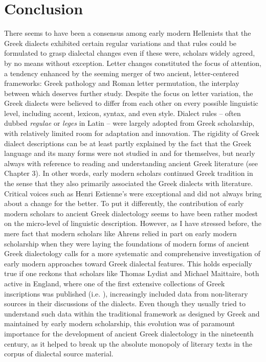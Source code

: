 \section{Conclusion}\label{sec:6.5}

There seems to have been a consensus among early modern Hellenists that the Greek dialects exhibited certain regular variations and that rules could be formulated to grasp dialectal changes even if these were, scholars widely agreed, by no means without exception. Letter changes constituted the focus of attention, a tendency enhanced by the seeming merger of two ancient, letter-centered frameworks: Greek pathology and Roman letter permutation, the interplay between which deserves further study. Despite the focus on letter variation, the Greek dialects were believed to differ from each other on every possible linguistic level, including accent, lexicon, syntax, and even style. Dialect rules – often dubbed \textit{regulae} or \textit{leges} in Latin – were largely adopted from Greek scholarship, with relatively limited room for adaptation and innovation. The rigidity of Greek dialect descriptions can be at least partly explained by the fact that the Greek language and its many forms were not studied in and for themselves, but nearly always with reference to reading and understanding ancient Greek literature (see Chapter 3). In other words, early modern scholars continued Greek tradition in the sense that they also primarily associated the Greek dialects with literature. Critical voices such as Henri Estienne’s were exceptional and did not always bring about a change for the better. To put it differently, the contribution of early modern scholars to ancient Greek dialectology seems to have been rather modest on the micro-level of linguistic description. However, as I have stressed before, the mere fact that modern scholars like Ahrens relied in part on early modern scholarship when they were laying the foundations of modern forms of ancient Greek dialectology calls for a more systematic and comprehensive investigation of early modern approaches toward Greek dialectal features. This holds especially true if one reckons that scholars like Thomas Lydiat and Michael Maittaire, both active in England, where one of the first extensive collections of Greek inscriptions was published (i.e. \citealt{Prideaux1676}), increasingly included data from non-literary sources in their discussions of the dialects. Even though they usually tried to understand such data within the traditional framework as designed by Greek and maintained by early modern scholarship, this evolution was of paramount importance for the development of ancient Greek dialectology in the nineteenth century, as it helped to break up the absolute monopoly of literary texts in the corpus of dialectal source material.

